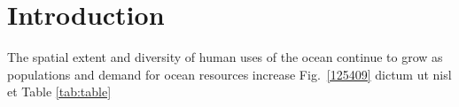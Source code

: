 \section{Introduction}
\label{introduction}

The spatial extent and diversity of human uses of the ocean continue to grow as populations and demand for ocean resources increase Fig.~\ref{125409} dictum ut nisl et Table \ref{tab:table}
